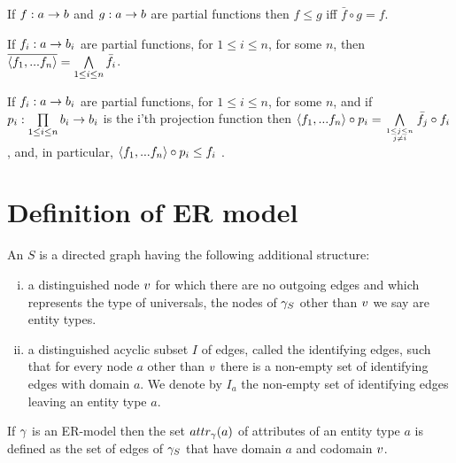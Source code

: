\begin{lemma}
If $f: a \rightarrow b$ and  $g: a \rightarrow b$ are partial functions then $f \leq g$ iff $\bar{f}\circ g= f$.
\end{lemma}

\begin{lemma}
If $f_i: a \rightarrow b_i$ are partial functions, for $1 \leq i \leq n$, for some $n$, then $\overline{\langle f_1,...f_n\rangle}=\bigwedge\limits_{1 \leq i \leq n}{\bar{f_i}}$.
\end{lemma}

\begin{lemma}
If $f_i: a \rightarrow b_i$ are partial functions, for $1 \leq i \leq n$, for some $n$, and if 
$p_i : \prod\limits_{1 \leq i \leq n}{b_i} \rightarrow b_i$ is the i'th projection function 
then  $\tuple{f_1,...f_n} \circ p_i = \bigwedge\limits_{\genfrac{}{}{0pt}{}{1 \leq j \leq n}{ j \neq i}}{\bar{f_j}}\circ f_i$, and,
in particular, $\langle f_1,...f_n\rangle \circ p_i\leq f_i$ .
\end{lemma}


\section{Definition of ER model}

\begin{definition}
An  $S$ is a directed graph having the following additional structure:
\begin{enumerate} [(i)]
\item{a distinguished node $v$ for which there are no outgoing edges and which represents the type of universals, 
 the nodes of $\gamma_S$ other than $v$ we say are entity types.} 

\item{a distinguished acyclic subset $I$ of edges, called the identifying edges, such that
for every node $a$ other than $v$ there is a non-empty set  of identifying edges with domain $a$.
 We denote by $I_a$ the non-empty set of identifying edges leaving an entity type $a$.}
\end{enumerate}
\end{definition}

If $\gamma$ is an ER-model then the set $attr_{\gamma}(a)$ of attributes of an entity type $a$ is defined as the set of edges of $\gamma_S$ that have 
domain $a$  and  codomain $v$.

